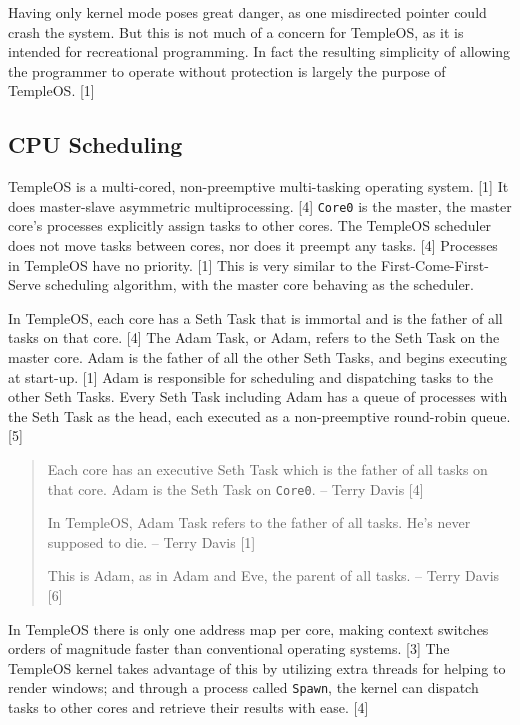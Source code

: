 \documentclass[11pt]{article}
\begin{document}
Having only kernel mode poses great danger, as one misdirected pointer could
crash the system. But this is not much of a concern for TempleOS, as it is
intended for recreational programming. In fact the resulting simplicity of
allowing the programmer to operate without protection is largely the purpose of
TempleOS. [1]

 \newpage

\subsection{CPU Scheduling}
\label{sec:org410add5}

TempleOS is a multi-cored, non-preemptive multi-tasking operating system. [1] It
does master-slave asymmetric multiprocessing. [4] \texttt{Core0} is the master, the
master core's processes explicitly assign tasks to other cores. The TempleOS
scheduler does not move tasks between cores, nor does it preempt any tasks. [4]
Processes in TempleOS have no priority. [1] This is very similar to the
First-Come-First-Serve scheduling algorithm, with the master core behaving as
the scheduler.

In TempleOS, each core has a Seth Task that is immortal and is the father of all
tasks on that core. [4] The Adam Task, or Adam, refers to the Seth Task on the
master core. Adam is the father of all the other Seth Tasks, and begins
executing at start-up. [1] Adam is responsible for scheduling and dispatching
tasks to the other Seth Tasks. Every Seth Task including Adam has a queue of
processes with the Seth Task as the head, each executed as a non-preemptive
round-robin queue. [5]

\begin{quote}
Each core has an executive Seth Task which is the father of all tasks on that
core. Adam is the Seth Task on \texttt{Core0}. -- Terry Davis [4]

In TempleOS, Adam Task refers to the father of all tasks. He's never supposed to
die. -- Terry Davis [1]

This is Adam, as in Adam and Eve, the parent of all tasks. -- Terry Davis [6]
\end{quote}

In TempleOS there is only one address map per core, making context switches
orders of magnitude faster than conventional operating systems. [3] The TempleOS
kernel takes advantage of this by utilizing extra threads for helping to render
windows; and through a process called \texttt{Spawn}, the kernel can dispatch tasks to
other cores and retrieve their results with ease. [4]
\end{document}
